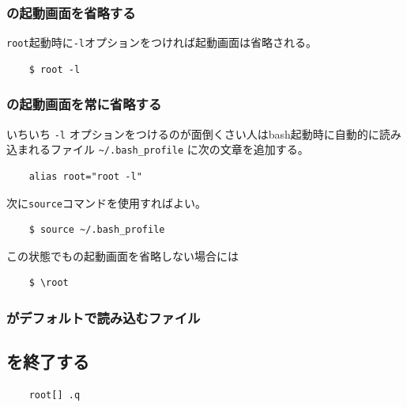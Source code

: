 \documentclass{jarticle}
\begin{document}
   \subsubsection{\ROOT の起動画面を省略する}
   \verb|root|起動時に\verb|-l|オプションをつければ起動画面は省略される。
\begin{verbatim}
	$ root -l
\end{verbatim}

   \subsubsection{\ROOT の起動画面を常に省略する}
   いちいち \verb|-l| オプションをつけるのが面倒くさい人はbash起動時に自動的に読み込まれるファイル \verb|~/.bash_profile| に次の文章を追加する。
\begin{verbatim}
	alias root="root -l"
\end{verbatim}
次に\verb|source|コマンドを使用すればよい。
\begin{verbatim}
	$ source ~/.bash_profile
\end{verbatim}


この状態でも\ROOT の起動画面を省略しない場合には
\begin{verbatim}
	$ \root 
\end{verbatim}

   \subsubsection{\ROOT がデフォルトで読み込むファイル}

  \subsection{\ROOT を終了する}

\begin{verbatim}
	root[] .q
\end{verbatim}


\clearpage
\end{document}
